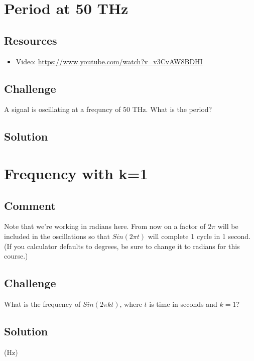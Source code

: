 \section{Period at 50 THz}

\subsection*{Resources}
\begin{itemize}
    \item Video: \url{https://www.youtube.com/watch?v=v3CvAW8BDHI}
\end{itemize}

\subsection*{Challenge}
A signal is oscillating at a frequncy of 50 THz.  What is the period?

\subsection*{Solution}




\newpage

\section{Frequency with k=1}

\subsection*{Comment}
Note that we're working in radians here. From now on a factor of $2 \pi$ will be included in the oscillations so that $Sin(2 \pi t)$ will complete 1 cycle in 1 second.  (If you calculator defaults to degrees, be sure to change it to radians for this course.)

\subsection*{Challenge}
What is the frequency of $Sin(2 \pi k t)$, where $t$ is time in seconds and $k=1$?

\subsection*{Solution}
(Hz)

